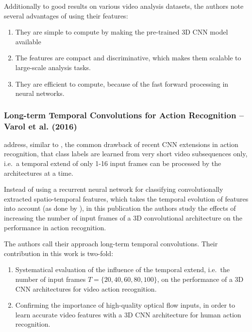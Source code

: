 Additionally to good results on various video analysis datasets, the authors note several advantages of using their features:
\begin{enumerate}
    \item They are simple to compute by making the pre-trained 3D CNN model available
    \item The features are compact and discriminative, which makes them scalable to large-scale analysis tasks.
    \item They are efficient to compute, because of the fast forward processing in neural networks.
\end{enumerate}


\subsubsection{Long-term Temporal Convolutions for Action Recognition -- Varol et al. (2016)}

\textcite{varol_long-term_2016} address, similar to \textcite{baccouche_sequential_2011}, the common drawback of recent CNN extensions in action recognition, that class labels are learned from very short video subsequences only, i.e.\ a temporal extend of only 1-16 input frames can be processed by the architectures at a time.\cite{ji_3d_2013}\cite{karpathy_large-scale_2014}\cite{tran_learning_2015}

Instead of using a recurrent neural network for classifying convolutionally extracted spatio-temporal features, which takes the temporal evolution of features into account (as done by \textcite{baccouche_sequential_2011}), in this publication the authors study the effects of increasing the number of input frames of a 3D convolutional architecture on the performance in action recognition.

The authors call their approach long-term temporal convolutions. Their contribution in this work is two-fold:
\begin{enumerate}
    \item Systematical evaluation of the influence of the temporal extend, i.e.\ the number of input frames $T = \{20, 40, 60, 80, 100\}$, on the performance of a 3D CNN architectures for video action recognition.  
    \item Confirming the importance of high-quality optical flow inputs, in order to learn accurate video features with a 3D CNN architecture for human action recognition.
\end{enumerate}

